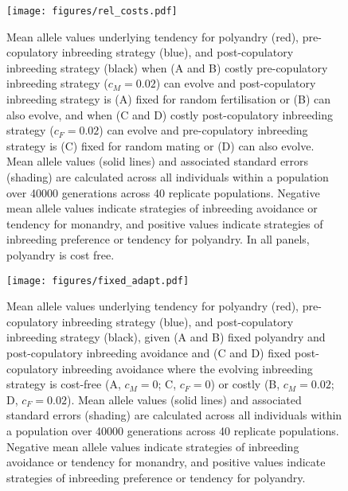 \documentclass[12pt]{article}
\begin{document}
\clearpage
\begin{figure}
\begin{center}				
\texttt{[image: figures/rel\_costs.pdf]}
\end{center}
\caption{Mean allele values underlying tendency for polyandry (red), pre-copulatory inbreeding strategy (blue), and post-copulatory inbreeding strategy (black) when (A and B) costly pre-copulatory inbreeding strategy ($c_{M} = 0.02$) can evolve and post-copulatory inbreeding strategy is (A) fixed for random fertilisation or (B) can also evolve, and when (C and D) costly post-copulatory inbreeding strategy ($c_{F} = 0.02$) can evolve and pre-copulatory inbreeding strategy is (C) fixed for random mating or (D) can also evolve. Mean allele values (solid lines) and associated standard errors (shading) are calculated across all individuals within a population over 40000 generations across 40 replicate populations. Negative mean allele values indicate strategies of inbreeding avoidance or tendency for monandry, and positive values indicate strategies of inbreeding preference or tendency for polyandry. In all panels, polyandry is cost free.}
\end{figure}

\clearpage
\begin{figure}
\begin{center}				
\texttt{[image: figures/fixed\_adapt.pdf]}
\end{center}
\caption{Mean allele values underlying tendency for polyandry (red), pre-copulatory inbreeding strategy (blue), and post-copulatory inbreeding strategy (black), given (A and B) fixed polyandry and post-copulatory inbreeding avoidance and (C and D) fixed post-copulatory inbreeding avoidance where the evolving inbreeding strategy is cost-free (A, $c_{M} = 0$; C, $c_{F} = 0$) or costly (B, $c_{M}=0.02$; D, $c_{F}=0.02$). Mean allele values (solid lines) and associated standard errors (shading) are calculated across all individuals within a population over 40000 generations across 40 replicate populations. Negative mean allele values indicate strategies of inbreeding avoidance or tendency for monandry, and positive values indicate strategies of inbreeding preference or tendency for polyandry.}
\end{figure}
\end{document}
